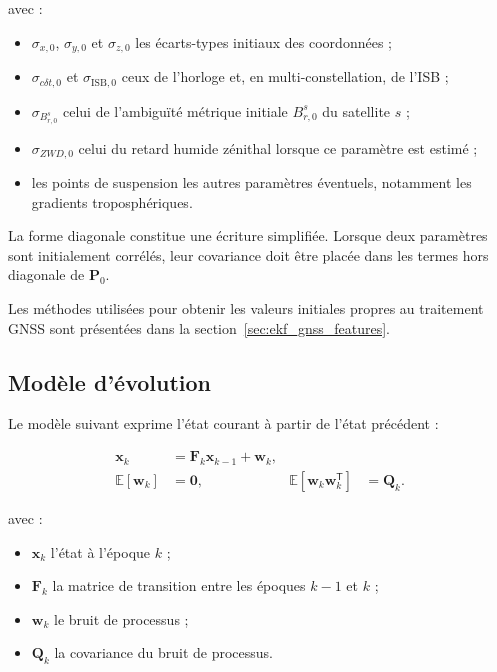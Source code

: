 avec :

\begin{itemize}
    \item $\sigma_{x,0}$, $\sigma_{y,0}$ et $\sigma_{z,0}$ les écarts-types
    initiaux des coordonnées ;
    \item $\sigma_{c\delta t,0}$ et $\sigma_{\mathrm{ISB},0}$ ceux de
    l'horloge et, en multi-constellation, de l'ISB ;
    \item $\sigma_{B_{r,0}^s}$ celui de l'ambiguïté métrique initiale
    $B_{r,0}^s$ du satellite $s$ ;
    \item $\sigma_{ZWD,0}$ celui du retard humide zénithal lorsque ce paramètre
    est estimé ;
    \item les points de suspension les autres paramètres éventuels, notamment
    les gradients troposphériques.
\end{itemize}

La forme diagonale constitue une écriture simplifiée. Lorsque deux paramètres
sont initialement corrélés, leur covariance doit être placée dans les termes
hors diagonale de $\mathbf P_0$. 

Les méthodes utilisées pour
obtenir les valeurs initiales propres au traitement GNSS sont présentées dans
la section~\ref{sec:ekf_gnss_features}.

\subsection{Modèle d'évolution}

Le modèle suivant exprime l'état courant à partir de l'état précédent :

\begin{align}
\mathbf x_k
&=
\mathbf F_k\mathbf x_{k-1}+\mathbf w_k,
\\
\mathbb E[\mathbf w_k]
&=\mathbf0,
&
\mathbb E[\mathbf w_k\mathbf w_k^{\mathsf T}]
&=\mathbf Q_k.
\label{eq:kalman_prediction}
\end{align}

avec :

\begin{itemize}
    \item $\mathbf x_k$ l'état à l'époque $k$ ;
    \item $\mathbf F_k$ la matrice de transition entre les époques $k-1$ et
    $k$ ;
    \item $\mathbf w_k$ le bruit de processus ;
    \item $\mathbf Q_k$ la covariance du bruit de processus.
\end{itemize}

